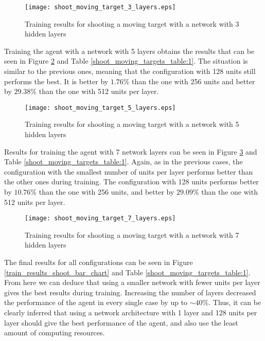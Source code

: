 \begin{figure}
    \begin{center}
        \texttt{[image: shoot\_moving\_target\_3\_layers.eps]}
        \caption{Training results for shooting a moving target with a network with 3 hidden layers}
        \label{train_results_shoot_3_layers}
    \end{center}
\end{figure}

Training the agent with a network with 5 layers obtains the results that can be seen in Figure \ref{train_results_shoot_5_layers} and Table \ref{shoot_moving_targets_table:1}. The situation is similar to the previous ones, meaning that the configuration with 128 units still performs the best. It is better by $1.76\%$ than the one with 256 units and better by $29.38\%$ than the one with 512 units per layer.

\begin{figure}
    \begin{center}
        \texttt{[image: shoot\_moving\_target\_5\_layers.eps]}
        \caption{Training results for shooting a moving target with a network with 5 hidden layers}
        \label{train_results_shoot_5_layers}
    \end{center}
\end{figure}

Results for training the agent with 7 network layers can be seen in Figure \ref{train_results_shoot_7_layers} and Table \ref{shoot_moving_targets_table:1}. Again, as in the previous cases, the configuration with the smallest number of units per layer performs better than the other ones during training. The configuration with 128 units performs better by $10.76\%$ than the one with 256 units, and better by $29.09\%$ than the one with 512 units per layer.

\begin{figure}
    \begin{center}
        \texttt{[image: shoot\_moving\_target\_7\_layers.eps]}
        \caption{Training results for shooting a moving target with a network with 7 hidden layers}
        \label{train_results_shoot_7_layers}
    \end{center}
\end{figure}

The final results for all configurations can be seen in Figure \ref{train_results_shoot_bar_chart} and Table \ref{shoot_moving_targets_table:1}. From here we can deduce that using a smaller network with fewer units per layer gives the best results during training. Increasing the number of layers decreased the performance of the agent in every single case by up to $\sim40\%$. Thus, it can be clearly inferred that using a network architecture with 1 layer and 128 units per layer should give the best performance of the agent, and also use the least amount of computing resources.

